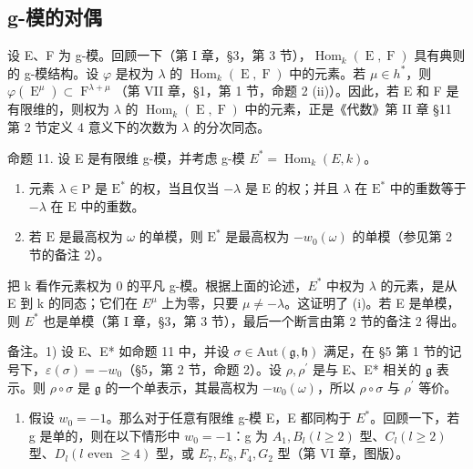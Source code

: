 \subsection{g-模的对偶}

设 E、F 为 g-模。回顾一下（第 I 章，§3，第 3 节），\(\operatorname{Hom}_{k}(\operatorname{E},\operatorname{F})\) 具有典则的 g-模结构。设 \(\varphi\) 是权为 \(\lambda\) 的 \(\operatorname{Hom}_{k}(\operatorname{E},\operatorname{F})\) 中的元素。若 \(\mu \in h^{*}\)，则 \(\varphi(\operatorname{E}^{\mu}) \subset \operatorname{F}^{\lambda + \mu}\)（第 VII 章，§1，第 1 节，命题 2 (ii)）。因此，若 E 和 F 是有限维的，则权为 \(\lambda\) 的 \(\operatorname{Hom}_{k}(\operatorname{E},\operatorname{F})\) 中的元素，正是《代数》第 II 章 §11 第 2 节定义 4 意义下的次数为 \(\lambda\) 的分次同态。

命题 11. 设 E 是有限维 g-模，并考虑 g-模 \(E^{*} = \operatorname{Hom}_{k}(E, k)\)。

\begin{enumerate}
\def\labelenumi{(\roman{enumi})}
\item
  元素 \(\lambda \in \mathrm{P}\) 是 \(\mathrm{E}^*\) 的权，当且仅当 \(-\lambda\) 是 \(\mathrm{E}\) 的权；并且 \(\lambda\) 在 \(\mathrm{E}^*\) 中的重数等于 \(-\lambda\) 在 \(\mathrm{E}\) 中的重数。
\item
  若 \(\mathrm{E}\) 是最高权为 \(\omega\) 的单模，则 \(\mathrm{E}^*\) 是最高权为 \(-w_0(\omega)\) 的单模（参见第 2 节的备注 2）。
\end{enumerate}

把 k 看作元素权为 0 的平凡 g-模。根据上面的论述，\(E^{*}\) 中权为 \(\lambda\) 的元素，是从 E 到 k 的同态；它们在 \(E^{\mu}\) 上为零，只要 \(\mu \neq -\lambda\)。这证明了 (i)。若 E 是单模，则 \(E^{*}\) 也是单模（第 I 章，§3，第 3 节），最后一个断言由第 2 节的备注 2 得出。

备注。1) 设 E、E* 如命题 11 中，并设 \(\sigma \in \mathrm{Aut}(\mathfrak{g},\mathfrak{h})\) 满足，在 §5 第 1 节的记号下，\(\varepsilon (\sigma) = -w_0\)（§5，第 2 节，命题 2）。设 \(\rho ,\rho^{\prime}\) 是与 E、E* 相关的 \(\mathfrak{g}\) 表示。则 \(\rho \circ \sigma\) 是 \(\mathfrak{g}\) 的一个单表示，其最高权为 \(-w_{0}(\omega)\)，所以 \(\rho \circ \sigma\) 与 \(\rho^{\prime}\) 等价。

\begin{enumerate}
\def\labelenumi{\arabic{enumi})}
\setcounter{enumi}{1}
\tightlist
\item
  假设 \(w_{0} = -1\)。那么对于任意有限维 g-模 E，E 都同构于 \(E^{*}\)。回顾一下，若 g 是单的，则在以下情形中 \(w_{0} = -1\)：g 为 \(A_{1}, B_{l} (l \geq 2)\) 型、\(C_{l} (l \geq 2)\) 型、\(D_{l} (l \text{ even } \geq 4)\) 型，或 \(E_{7}, E_{8}, F_{4}, G_{2}\) 型（第 VI 章，图版）。
\end{enumerate}


